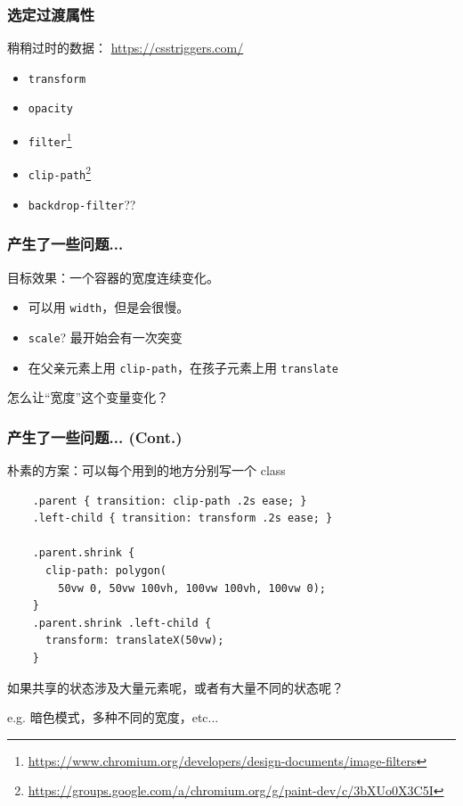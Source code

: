 \documentclass[UTF-8]{ctexbeamer}
\begin{document}
\begin{frame}
  \frametitle{选定过渡属性}

  稍稍过时的数据： \url{https://csstriggers.com/}

  \vspace{2em}

  \begin{itemize}
    \item \texttt{transform}
    \item \texttt{opacity}
    \item \texttt{filter}\footnote{\url{https://www.chromium.org/developers/design-documents/image-filters}}
    \item \texttt{clip-path}\footnote{\url{https://groups.google.com/a/chromium.org/g/paint-dev/c/3bXUo0X3C5I}}
    \item \texttt{backdrop-filter}??
  \end{itemize}

\end{frame}

\begin{frame}
  \frametitle{产生了一些问题...}

  目标效果：一个容器的宽度连续变化。

  \vspace{2em}
  \pause

  \begin{itemize}
    \item 可以用 \texttt{width}，但是会很慢。
    \pause
    \item \texttt{scale}? 最开始会有一次突变
    \pause
    \item 在父亲元素上用 \texttt{clip-path}，在孩子元素上用 \texttt{translate}
  \end{itemize}

  \pause
  \vspace{2em}
  怎么让“宽度”这个变量变化？
\end{frame}

\begin{frame}[fragile]
  \frametitle{产生了一些问题... (Cont.)}

  朴素的方案：可以每个用到的地方分别写一个 class

  \begin{verbatim}
    .parent { transition: clip-path .2s ease; }
    .left-child { transition: transform .2s ease; }

    .parent.shrink {
      clip-path: polygon(
        50vw 0, 50vw 100vh, 100vw 100vh, 100vw 0);
    }
    .parent.shrink .left-child {
      transform: translateX(50vw);
    }
  \end{verbatim}

  \pause

  \vspace{2em}
  如果共享的状态涉及大量元素呢，或者有大量不同的状态呢？
  
  e.g. 暗色模式，多种不同的宽度，etc...
\end{frame}
\end{document}
